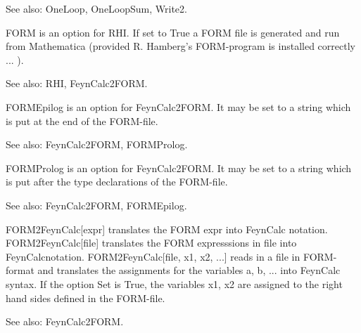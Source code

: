 See also:  OneLoop, OneLoopSum, Write2.



FORM is an option for RHI. If set to True a FORM file is generated and run from Mathematica (provided R. Hamberg's FORM-program is
  installed correctly ... ).

See also:  RHI, FeynCalc2FORM.



FORMEpilog is an option for FeynCalc2FORM. It may be set to a string which is put at the end of the FORM-file.

See also:  FeynCalc2FORM, FORMProlog.



FORMProlog is an option for FeynCalc2FORM. It may be set to a string which is put after the type declarations of the FORM-file.

See also:  FeynCalc2FORM, FORMEpilog.



FORM2FeynCalc[expr] translates the FORM expr into FeynCalc notation. FORM2FeynCalc[file] translates the FORM expresssions in file into
  FeynCalcnotation. FORM2FeynCalc[file, x1, x2, ...] reads in a file in FORM-format and translates the assignments for the variables a,
  b, ... into FeynCalc syntax. If the option Set is True, the variables x1, x2 are assigned to the right hand sides defined in the
  FORM-file.

See also:  FeynCalc2FORM.



